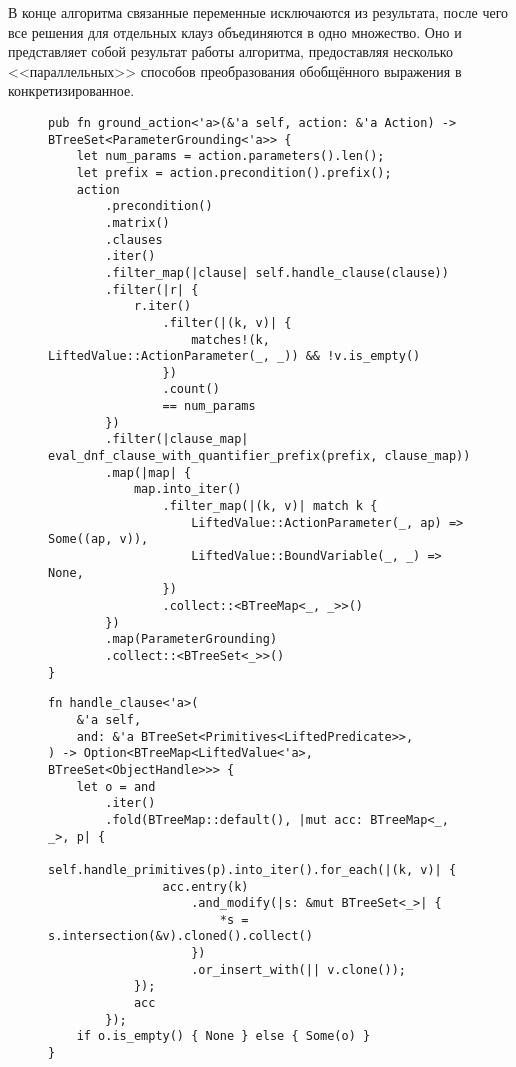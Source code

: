 \documentclass{article}
\begin{document}
В конце алгоритма связанные переменные исключаются из результата, после чего все решения для отдельных клауз объединяются в одно множество.
Оно и представляет собой результат работы алгоритма,
предоставляя несколько <<параллельных>> способов преобразования обобщённого выражения в конкретизированное.

\begin{figure}
  \begin{verbatim}
pub fn ground_action<'a>(&'a self, action: &'a Action) -> BTreeSet<ParameterGrounding<'a>> {
    let num_params = action.parameters().len();
    let prefix = action.precondition().prefix();
    action
        .precondition()
        .matrix()
        .clauses
        .iter()
        .filter_map(|clause| self.handle_clause(clause))
        .filter(|r| {
            r.iter()
                .filter(|(k, v)| {
                    matches!(k, LiftedValue::ActionParameter(_, _)) && !v.is_empty()
                })
                .count()
                == num_params
        })
        .filter(|clause_map| eval_dnf_clause_with_quantifier_prefix(prefix, clause_map))
        .map(|map| {
            map.into_iter()
                .filter_map(|(k, v)| match k {
                    LiftedValue::ActionParameter(_, ap) => Some((ap, v)),
                    LiftedValue::BoundVariable(_, _) => None,
                })
                .collect::<BTreeMap<_, _>>()
        })
        .map(ParameterGrounding)
        .collect::<BTreeSet<_>>()
}
  \end{verbatim}
  \label{code:groundaction}
\end{figure}

\begin{figure}
  \begin{verbatim}
fn handle_clause<'a>(
    &'a self,
    and: &'a BTreeSet<Primitives<LiftedPredicate>>,
) -> Option<BTreeMap<LiftedValue<'a>, BTreeSet<ObjectHandle>>> {
    let o = and
        .iter()
        .fold(BTreeMap::default(), |mut acc: BTreeMap<_, _>, p| {
            self.handle_primitives(p).into_iter().for_each(|(k, v)| {
                acc.entry(k)
                    .and_modify(|s: &mut BTreeSet<_>| {
                        *s = s.intersection(&v).cloned().collect()
                    })
                    .or_insert_with(|| v.clone());
            });
            acc
        });
    if o.is_empty() { None } else { Some(o) }
}
  \end{verbatim}
  \label{code:handleclause}
\end{figure}
\end{document}
